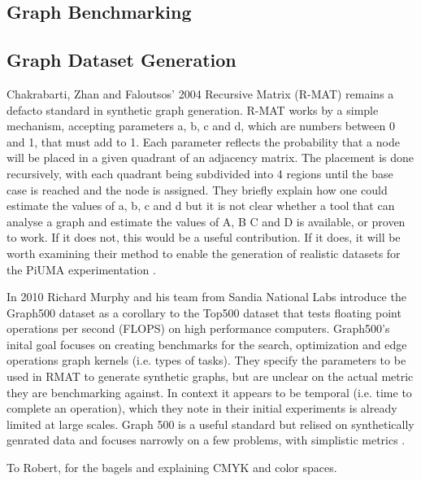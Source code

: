 \documentclass[sigconf,authordraft]{acmart}
\begin{document}
\subsection{Graph Benchmarking}

\subsection{Graph Dataset Generation}

\par{Chakrabarti, Zhan and Faloutsos' 2004 Recursive Matrix (R-MAT) remains a defacto standard in synthetic graph generation. 
R-MAT works by a simple mechanism, accepting parameters a, b, c and d, which are numbers between 0 and 1, that must add to 1. 
Each parameter reflects the probability that a node will be placed in a given quadrant of an adjacency matrix. 
The placement is done recursively, with each quadrant being subdivided into 4 regions until the base case is reached and the node is assigned. 
They briefly explain how one could estimate the values of a, b, c and d but it is not clear whether a tool that can analyse a graph and estimate the values of A, B C and D is available, or proven to work. 
If it does not, this would be a useful contribution. 
If it does, it will be worth examining their method to enable the generation of realistic datasets for the PiUMA experimentation \cite{Chakrabarti2004}.}

\par{In 2010 Richard Murphy and his team from Sandia National Labs introduce the Graph500 dataset as a corollary to the Top500 dataset that tests floating point operations per second (FLOPS) on high performance computers. 
Graph500's inital goal focuses on creating benchmarks for the search, optimization and edge operations graph kernels (i.e. types of tasks).
They specify the parameters to be used in RMAT to generate synthetic graphs, but are unclear on the actual metric they are benchmarking against. 
In context it appears to be temporal (i.e. time to complete an operation), which they note in their initial experiments is already limited at large scales. 
Graph 500 is a useful standard but relised on synthetically genrated data and focuses narrowly on a few problems, with simplistic metrics \cite{Murphy2010}.}

\begin{acks}
To Robert, for the bagels and explaining CMYK and color spaces.
\end{acks}




\end{document}
